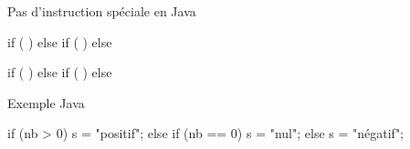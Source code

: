 \begin{frame}[fragile]{Pas d'instruction spéciale en Java}
  \begin{multicols}{2}
\begin{grammaire}
if (  )
else
    if (  )
    else
\end{grammaire}
\pause
\begin{grammaire}
if (  )
else if (  )
else
\end{grammaire}
  \end{multicols}
\end{frame}

\begin{frame}[fragile]{Exemple Java}
  \begin{java}
if (nb > 0){
    s = "positif";
} else if (nb == 0) {
    s = "nul";
} else {
    s = "négatif";
}
  \end{java}
\end{frame}

